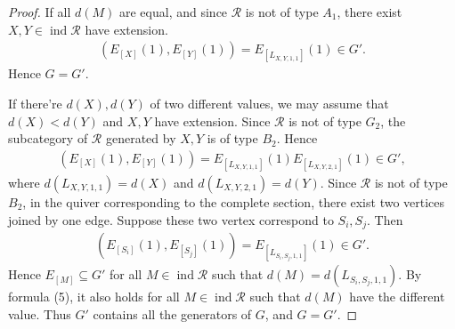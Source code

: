 \documentclass[10pt,a4paper]{amsart}
\begin{document}
\begin{proof}
   If all $d(M)$ are equal, and since $\mathcal{R}$ is not of type $A_1$, there exist $X,Y\in \operatorname{ind}\mathcal{R}$ have extension.
   \begin{align*}
    (E_{[X]}(1),E_{[Y]}(1)) = E_{[L_{X,Y,1,1}]}(1) \in G'.
   \end{align*}
   Hence $G=G'$.

   If there're $d(X),d(Y)$ of two different values, we may assume that $d(X)<d(Y)$ and $X,Y$ have extension.
   Since $\mathcal{R}$ is not of type $G_2$, the subcategory of $\mathcal{R}$ generated by $X,Y$ is of type $B_2$. Hence
   \begin{align}
    (E_{[X]}(1),E_{[Y]}(1)) = E_{[L_{X,Y,1,1}]}(1) E_{[L_{X,Y,2,1}]}(1) \in G',
   \end{align}
   where $d(L_{X,Y,1,1})=d(X)$ and $d(L_{X,Y,2,1})=d(Y)$.
   Since $\mathcal{R}$ is not of type $B_2$, in the quiver corresponding to the complete section, there exist two vertices joined by one edge.
   Suppose these two vertex correspond to $S_i,S_j$. Then
   \begin{align*}
    (E_{[S_i]}(1),E_{[S_j]}(1)) = E_{[L_{S_i,S_j,1,1}]}(1) \in G'.
   \end{align*}
   Hence $E_{[M]}\subseteq  G'$ for all $M\in \operatorname{ind}\mathcal{R}$ such that $d(M) = d(L_{S_i,S_j,1,1})$.
   By formula (5), it also holds for all $M\in \operatorname{ind}\mathcal{R}$ such that $d(M)$ have the different value.
   Thus $G'$ contains all the generators of $G$, and $G=G'$.
\end{proof}
\end{document}
